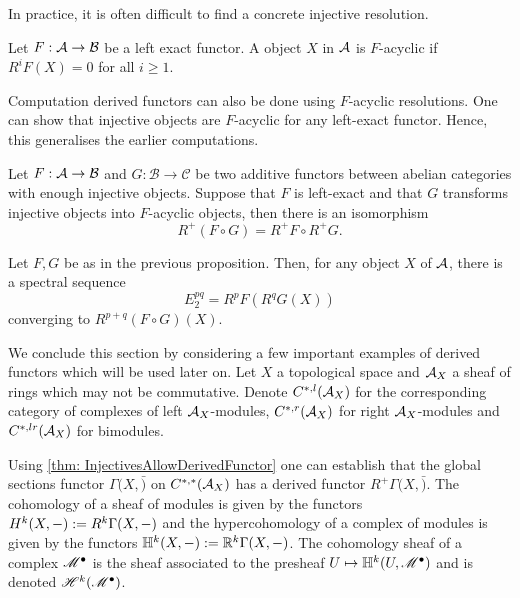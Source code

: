In practice, it is often difficult to find a concrete injective resolution.
\begin{definition}
 Let $F:\AA \to \mathcal{B}$ be a left exact functor.
 A object $X$ in $\AA$ is $F$-acyclic if $R^iF(X) = 0$ for all $i\geq 1$.
\end{definition}
Computation derived functors can also be done using $F$-acyclic resolutions.
One can show that injective objects are $F$-acyclic for any left-exact functor.
Hence, this generalises the earlier computations.
\begin{proposition}
  Let $F:\AA \to \mathcal{B}$ and $G:\mathcal{B}\to \mathcal{C}$ be two additive functors between abelian categories with enough injective objects. Suppose that $F$ is left-exact and that $G$ transforms injective objects into $F$-acyclic objects, then there is an isomorphism
  $$R^+(F\circ G) = R^+F \circ R^+ G.$$
\end{proposition}
\begin{theorem}
  Let $F,G$ be as in the previous proposition. Then, for any object $X$ of $\AA$, there is a spectral sequence
  $$E_2^{pq} = R^pF(R^qG(X)) $$
  converging to $R^{p+q}(F\circ G)(X).$
\end{theorem}
We conclude this section by considering a few important examples of derived functors which will be used later on.
Let $X$ a topological space and $\AA_X$ a sheaf of rings which may not be commutative.
Denote $C^{*,l}(\AA_X)$ for the corresponding category of complexes of left $\AA_X$-modules, $C^{*,r}(\AA_X)$ for right $\AA_X$-modules and $C^{*,lr}(\AA_X)$ for bimodules.

Using \cref{thm: InjectivesAllowDerivedFunctor} one can establish that the global sections functor $\Gamma(X,\bar)$ on $C^{*,*}(\AA_X)$ has a derived functor $R^+\Gamma(X,\bar)$.
The cohomology of a sheaf of modules is given by the functors $H^k(X,\blank) := R^k \Gamma(X,\blank)$ and the hypercohomology of a complex of modules is given by the functors $\mathbb{H}^k(X,\blank):= \mathbb{R}^k\Gamma(X,\blank)$.
The cohomology sheaf of a complex $\M^\bullet$ is the sheaf associated to the presheaf $U\mapsto \mathbb{H}^k(U,\M^\bullet)$ and is denoted $\H^k(\M^\bullet)$.

